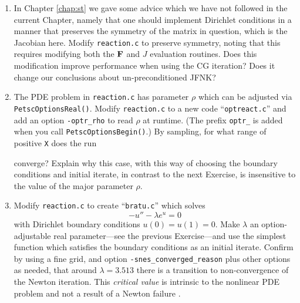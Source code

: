 \begin{enumerate}
\item \label{exer:nl:symmetrizeJ}  In Chapter \ref{chap:st} we gave some advice which we have not followed in the current Chapter, namely that one should implement Dirichlet conditions in a manner that preserves the symmetry of the matrix in question, which is the Jacobian here.  Modify \texttt{reaction.c} to preserve symmetry, noting that this requires modifying both the $\mathbf{F}$ and $J$ evaluation routines.  Does this modification improve performance when using the CG iteration?  Does it change our conclusions about un-preconditioned JFNK?

\item The PDE problem in \texttt{reaction.c} has parameter $\rho$ which can be adjusted via \texttt{PetscOptionsReal()}.  Modify \texttt{reaction.c} to a new code ``\texttt{optreact.c}'' and add an option \texttt{-optr\_rho} to read $\rho$ at runtime.  (The prefix \texttt{optr\_} is added when you call \texttt{PetscOptionsBegin()}.)  By sampling, for what range of positive \texttt{X} does the run
converge?  Explain why this case, with this way of choosing the boundary conditions and initial iterate, in contrast to the next Exercise, is insensitive to the value of the major parameter $\rho$.

\item \label{exer:nl:bratu} Modify \texttt{reaction.c} to create ``\texttt{bratu.c}'' which solves
\begin{equation}
    - u'' - \lambda e^u = 0 \label{eq:nl:bratuoned}
\end{equation}
with Dirichlet boundary conditions $u(0)=u(1)=0$.  Make $\lambda$ an option-adjustable real parameter---see the previous Exercise---and use the simplest function which satisfies the boundary conditions as an initial iterate.  Confirm by using a fine grid, and option \texttt{-snes\_converged\_reason} plus other options as needed, that around $$ there is a transition to non-convergence of the Newton iteration.  This \emph{critical value} is intrinsic to the nonlinear PDE problem and not a result of a Newton failure \citep{Doedeletal1991}.


\end{enumerate}
